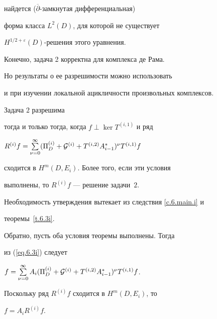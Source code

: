 найдется ($\overline \partial$-замкнутая дифференциальная)


форма класса $L^2 (D)$, для которой не существует


$ H^{1/2+ \varepsilon} (D)$-решения этого уравнения.





Конечно, задача 2 корректна для комплекса де Рама.


Но результаты о ее разрешимости можно использовать


и при изучении локальной ацикличности произвольных комплексов.








\begin{thm}


\label{t.7.3}


Задача $2$ разрешима


тогда и только тогда, когда $f \perp \ker T^{(i,1)}$ и ряд


$R^{(i)}f=\sum\limits_{\nu=0}^{\infty}(\Pi ^{(i)}_{D} +


{\cal G}^{(i)}+T^{(i,2)} A^*_{i-1})^{\nu} T^{(i,1)}f$


сходится в $H^{m} (D, E_i)$. Более того, если эти условия


выполнены, то $R^{(i)}f$ --- решение задачи~$2$.


\end{thm}








\begin{pf}


Необходимость утверждения вытекает из следствия \ref{c.6.main.i} и


теоремы~\ref{t.6.3i}.





Обратно, пусть оба условия теоремы выполнены. Тогда


из (\ref{eq.6.3i}) следует


$f=\sum\limits_{\nu=0}^{\infty} A_i(\Pi ^{(i)}_{D} +


{\cal G}^{(i)} +T^{(i,2)} A^*_{i-1})^{\nu} T^{(i,1)} f$.


Поскольку ряд $R^{(i)}f$ сходится в $H^{m} (D, E_i)$, то


$f=A_i R^{(i)}f$.


\end{pf}





